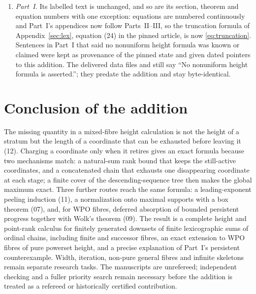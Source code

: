\documentclass[11pt,a4paper]{article}
\theoremstyle{definition}
\theoremstyle{remark}
\begin{document}
\begin{enumerate}
and Vialard width entries are new.
\item \emph{Part~I.} Its labelled text is unchanged, and so are its section,
theorem and equation numbers with one exception: equations are numbered
continuously and Part~I's appendices now follow Parts~II--III, so the
truncation formula of Appendix~\ref{sec:lex}, equation (24) in the pinned
article, is now \eqref{eq:truncation}. Sentences in Part~I that said
no nonuniform height formula was known or claimed were kept as provenance of the
pinned state and given dated pointers to this addition. The delivered data files
 and
 still say ``No nonuniform
height formula is asserted.''; they predate the addition and stay byte-identical.
\end{enumerate}

\section{Conclusion of the addition}\label{nh:sec:conclusion}

The missing quantity in a mixed-fibre height calculation is not the height of a
stratum but the length of a coordinate that can be exhausted before leaving it (12).
Charging a coordinate only when it retires gives an exact formula because two
mechanisms match: a natural-sum rank bound that keeps the still-active coordinates,
and a concatenated chain that exhausts one disappearing coordinate at each stage;
a finite cover of the descending-sequence tree then makes the global maximum exact.
Three further routes reach the same formula: a leading-exponent peeling induction
(11), a normalization onto maximal supports with a box theorem (07), and, for WPO
fibres, deferred absorption of bounded persistent progress together with Wolk's
theorem (09). The result is a complete height and point-rank calculus for finitely
generated downsets of finite lexicographic sums of ordinal chains, including finite
and successor fibres, an exact extension to WPO fibres of pure powerset height, and a
precise explanation of Part~I's persistent counterexample. Width, iteration,
non-pure general fibres and infinite skeletons remain separate research tasks. The
manuscripts are unrefereed; independent checking and a fuller priority search remain
necessary before the addition is treated as a refereed or historically certified
contribution.
\end{document}

